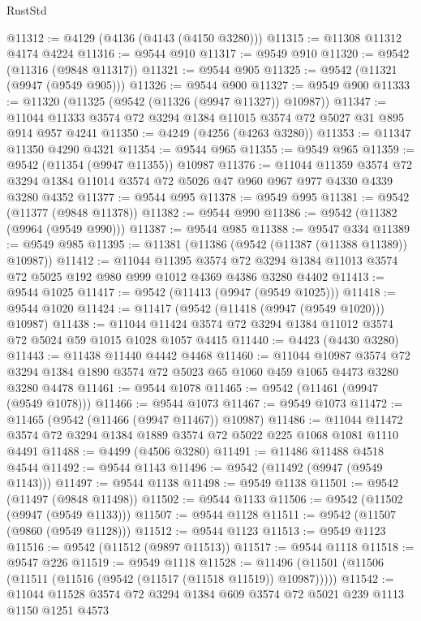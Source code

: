 \begin{lexlean}{RustStd}
\begin{coremodule}
@11312 := @4129 (@4136 (@4143 (@4150 @3280)))
@11315 := @11308 @11312 @4174 @4224
@11316 := @9544 @910
@11317 := @9549 @910
@11320 := @9542 (@11316 (@9848 @11317))
@11321 := @9544 @905
@11325 := @9542 (@11321 (@9947 (@9549 @905)))
@11326 := @9544 @900
@11327 := @9549 @900
@11333 := @11320 (@11325 (@9542 (@11326 (@9947 @11327)) @10987))
@11347 := @11044 @11333 @3574 @72 @3294 @1384 @11015 @3574 @72 @5027 @31 @895 @914 @957 @4241
@11350 := @4249 (@4256 (@4263 @3280))
@11353 := @11347 @11350 @4290 @4321
@11354 := @9544 @965
@11355 := @9549 @965
@11359 := @9542 (@11354 (@9947 @11355)) @10987
@11376 := @11044
    @11359
    @3574
    @72
    @3294
    @1384
    @11014
    @3574
    @72
    @5026
    @47
    @960
    @967
    @977
    @4330
    @4339
    @3280
    @4352
@11377 := @9544 @995
@11378 := @9549 @995
@11381 := @9542 (@11377 (@9848 @11378))
@11382 := @9544 @990
@11386 := @9542 (@11382 (@9964 (@9549 @990)))
@11387 := @9544 @985
@11388 := @9547 @334
@11389 := @9549 @985
@11395 := @11381 (@11386 (@9542 (@11387 (@11388 @11389)) @10987))
@11412 := @11044
    @11395
    @3574
    @72
    @3294
    @1384
    @11013
    @3574
    @72
    @5025
    @192
    @980
    @999
    @1012
    @4369
    @4386
    @3280
    @4402
@11413 := @9544 @1025
@11417 := @9542 (@11413 (@9947 (@9549 @1025)))
@11418 := @9544 @1020
@11424 := @11417 (@9542 (@11418 (@9947 (@9549 @1020))) @10987)
@11438 := @11044 @11424 @3574 @72 @3294 @1384 @11012 @3574 @72 @5024 @59 @1015 @1028 @1057 @4415
@11440 := @4423 (@4430 @3280)
@11443 := @11438 @11440 @4442 @4468
@11460 := @11044
    @10987
    @3574
    @72
    @3294
    @1384
    @1890
    @3574
    @72
    @5023
    @65
    @1060
    @459
    @1065
    @4473
    @3280
    @3280
    @4478
@11461 := @9544 @1078
@11465 := @9542 (@11461 (@9947 (@9549 @1078)))
@11466 := @9544 @1073
@11467 := @9549 @1073
@11472 := @11465 (@9542 (@11466 (@9947 @11467)) @10987)
@11486 := @11044 @11472 @3574 @72 @3294 @1384 @1889 @3574 @72 @5022 @225 @1068 @1081 @1110 @4491
@11488 := @4499 (@4506 @3280)
@11491 := @11486 @11488 @4518 @4544
@11492 := @9544 @1143
@11496 := @9542 (@11492 (@9947 (@9549 @1143)))
@11497 := @9544 @1138
@11498 := @9549 @1138
@11501 := @9542 (@11497 (@9848 @11498))
@11502 := @9544 @1133
@11506 := @9542 (@11502 (@9947 (@9549 @1133)))
@11507 := @9544 @1128
@11511 := @9542 (@11507 (@9860 (@9549 @1128)))
@11512 := @9544 @1123
@11513 := @9549 @1123
@11516 := @9542 (@11512 (@9897 @11513))
@11517 := @9544 @1118
@11518 := @9547 @226
@11519 := @9549 @1118
@11528 := @11496 (@11501 (@11506 (@11511 (@11516 (@9542 (@11517 (@11518 @11519)) @10987)))))
@11542 := @11044 @11528 @3574 @72 @3294 @1384 @609 @3574 @72 @5021 @239 @1113 @1150 @1251 @4573

\end{coremodule}
\end{lexlean}
